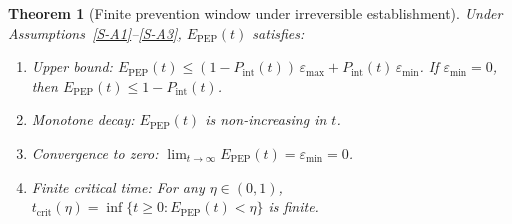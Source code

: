 \documentclass[12pt,a4paper]{article}
\theoremstyle{plain}
\newtheorem{theorem}{Theorem}
\theoremstyle{definition}
\theoremstyle{remark}
\newcommand{\Pint}{P_{\mathrm{int}}}
\newcommand{\Epep}{E_{\mathrm{PEP}}}
\newcommand{\tcrit}{t_{\mathrm{crit}}}
\begin{document}
\begin{theorem}[Finite prevention window under irreversible establishment]\label{thm:S-window}
Under Assumptions~\ref{S-A1}--\ref{S-A3}, $\Epep(t)$ satisfies:
\begin{enumerate}
    \item \emph{Upper bound}: $\Epep(t) \leq (1 - \Pint(t))\,\varepsilon_{\max} + \Pint(t)\,\varepsilon_{\min}$. If $\varepsilon_{\min} = 0$, then $\Epep(t) \leq 1 - \Pint(t)$.
    \item \emph{Monotone decay}: $\Epep(t)$ is non-increasing in $t$.
    \item \emph{Convergence to zero}: $\lim_{t \to \infty} \Epep(t) = \varepsilon_{\min} = 0$.
    \item \emph{Finite critical time}: For any $\eta \in (0,1)$, $\tcrit(\eta) = \inf\{t \geq 0 : \Epep(t) < \eta\}$ is finite.
\end{enumerate}
\end{theorem}
\end{document}
